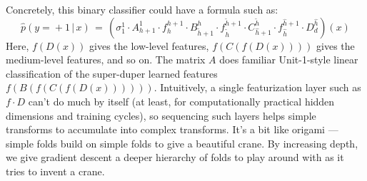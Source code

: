 Concretely, this binary classifier could have a formula such
as:
$$
  \hat p(y\!=\!+1\,|\,x) \,=\,
  (\sigma^{1}_{1} \cdot
  A^{1}_{h+1} \cdot
  f^{h+1}_{h} \cdot
  B^{h}_{\tilde h+1} \cdot
  f^{\tilde h+1}_{\tilde h} \cdot
  C^{\tilde h}_{\hat h+1} \cdot
  f^{\hat h+1}_{\hat h} \cdot
  D^{\hat h}_{d})(x)
$$
Here, $f(D(x))$ gives the low-level features, $f(C(f(D(x))))$ gives the
medium-level features, and so on.  The matrix $A$ does familiar Unit-1-style
linear classification of the super-duper learned features $f(B(f(C(f(D(x))))))$.
%
Intuitively, a single featurization layer such as $f\cdot D$ can't do much by
itself (at least, for computationally practical hidden dimensions and training
cycles), so sequencing such layers helps simple transforms to accumulate into
complex transforms.  It's a bit like origami --- simple folds build on simple
folds to give a beautiful crane.  By increasing depth, we give gradient descent
a deeper hierarchy of folds to play around with as it tries to invent a crane.




